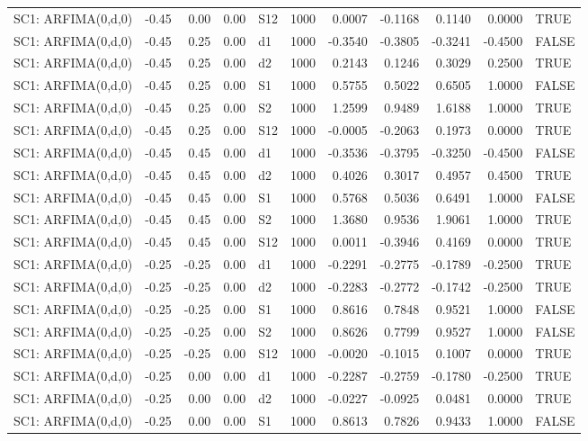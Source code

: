 \begin{table}[ht]
\begin{tabular}{lrrrlrrrrrl}
  SC1: ARFIMA(0,d,0) & -0.45 & 0.00 & 0.00 & S12 & 1000 & 0.0007 & -0.1168 & 0.1140 & 0.0000 & TRUE \\ 
  SC1: ARFIMA(0,d,0) & -0.45 & 0.25 & 0.00 & d1 & 1000 & -0.3540 & -0.3805 & -0.3241 & -0.4500 & FALSE \\ 
  SC1: ARFIMA(0,d,0) & -0.45 & 0.25 & 0.00 & d2 & 1000 & 0.2143 & 0.1246 & 0.3029 & 0.2500 & TRUE \\ 
  SC1: ARFIMA(0,d,0) & -0.45 & 0.25 & 0.00 & S1 & 1000 & 0.5755 & 0.5022 & 0.6505 & 1.0000 & FALSE \\ 
  SC1: ARFIMA(0,d,0) & -0.45 & 0.25 & 0.00 & S2 & 1000 & 1.2599 & 0.9489 & 1.6188 & 1.0000 & TRUE \\ 
  SC1: ARFIMA(0,d,0) & -0.45 & 0.25 & 0.00 & S12 & 1000 & -0.0005 & -0.2063 & 0.1973 & 0.0000 & TRUE \\ 
  SC1: ARFIMA(0,d,0) & -0.45 & 0.45 & 0.00 & d1 & 1000 & -0.3536 & -0.3795 & -0.3250 & -0.4500 & FALSE \\ 
  SC1: ARFIMA(0,d,0) & -0.45 & 0.45 & 0.00 & d2 & 1000 & 0.4026 & 0.3017 & 0.4957 & 0.4500 & TRUE \\ 
  SC1: ARFIMA(0,d,0) & -0.45 & 0.45 & 0.00 & S1 & 1000 & 0.5768 & 0.5036 & 0.6491 & 1.0000 & FALSE \\ 
  SC1: ARFIMA(0,d,0) & -0.45 & 0.45 & 0.00 & S2 & 1000 & 1.3680 & 0.9536 & 1.9061 & 1.0000 & TRUE \\ 
  SC1: ARFIMA(0,d,0) & -0.45 & 0.45 & 0.00 & S12 & 1000 & 0.0011 & -0.3946 & 0.4169 & 0.0000 & TRUE \\ 
  SC1: ARFIMA(0,d,0) & -0.25 & -0.25 & 0.00 & d1 & 1000 & -0.2291 & -0.2775 & -0.1789 & -0.2500 & TRUE \\ 
  SC1: ARFIMA(0,d,0) & -0.25 & -0.25 & 0.00 & d2 & 1000 & -0.2283 & -0.2772 & -0.1742 & -0.2500 & TRUE \\ 
  SC1: ARFIMA(0,d,0) & -0.25 & -0.25 & 0.00 & S1 & 1000 & 0.8616 & 0.7848 & 0.9521 & 1.0000 & FALSE \\ 
  SC1: ARFIMA(0,d,0) & -0.25 & -0.25 & 0.00 & S2 & 1000 & 0.8626 & 0.7799 & 0.9527 & 1.0000 & FALSE \\ 
  SC1: ARFIMA(0,d,0) & -0.25 & -0.25 & 0.00 & S12 & 1000 & -0.0020 & -0.1015 & 0.1007 & 0.0000 & TRUE \\ 
  SC1: ARFIMA(0,d,0) & -0.25 & 0.00 & 0.00 & d1 & 1000 & -0.2287 & -0.2759 & -0.1780 & -0.2500 & TRUE \\ 
  SC1: ARFIMA(0,d,0) & -0.25 & 0.00 & 0.00 & d2 & 1000 & -0.0227 & -0.0925 & 0.0481 & 0.0000 & TRUE \\ 
  SC1: ARFIMA(0,d,0) & -0.25 & 0.00 & 0.00 & S1 & 1000 & 0.8613 & 0.7826 & 0.9433 & 1.0000 & FALSE \\ 

\end{tabular}
\end{table}
